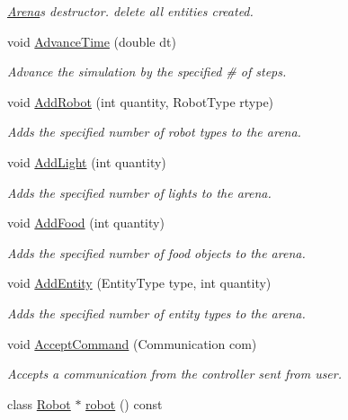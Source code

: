 \begin{DoxyCompactItemize}
\begin{DoxyCompactList}\small\item\em \hyperlink{classArena}{Arena}\textquotesingle{}s destructor. {\ttfamily delete} all entities created. \end{DoxyCompactList}\item 
void \hyperlink{classArena_ad92d8b2e1593b652445e31d173977fc6}{Advance\+Time} (double dt)
\begin{DoxyCompactList}\small\item\em Advance the simulation by the specified \# of steps. \end{DoxyCompactList}\item 
void \hyperlink{classArena_aa6f5533d07f58987991fa5ccf0cd2575}{Add\+Robot} (int quantity, Robot\+Type rtype)
\begin{DoxyCompactList}\small\item\em Adds the specified number of robot types to the arena. \end{DoxyCompactList}\item 
void \hyperlink{classArena_a6c32af2d77a9afde2a41aa7359a62763}{Add\+Light} (int quantity)
\begin{DoxyCompactList}\small\item\em Adds the specified number of lights to the arena. \end{DoxyCompactList}\item 
void \hyperlink{classArena_a663b46b86ee69523e993ec38d079c482}{Add\+Food} (int quantity)
\begin{DoxyCompactList}\small\item\em Adds the specified number of food objects to the arena. \end{DoxyCompactList}\item 
void \hyperlink{classArena_a9e00ef1a079d49d648359952fcfaa9f3}{Add\+Entity} (Entity\+Type type, int quantity)
\begin{DoxyCompactList}\small\item\em Adds the specified number of entity types to the arena. \end{DoxyCompactList}\item 
void \hyperlink{classArena_a16fac8e4b2399fcf0db01a9722069c33}{Accept\+Command} (Communication com)
\begin{DoxyCompactList}\small\item\em Accepts a communication from the controller sent from user. \end{DoxyCompactList}\item 
class \hyperlink{classRobot}{Robot} $\ast$ \hyperlink{classArena_af9b489317866a4541c6531acb63602c3}{robot} () const 

\end{DoxyCompactItemize}
